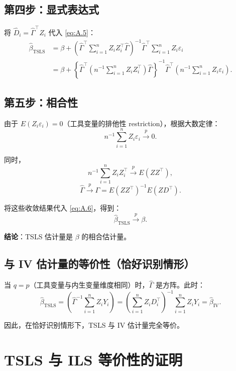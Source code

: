 \subsection*{第四步：显式表达式}

将 $\hat{D}_i = \hat{\Gamma}^{\top}Z_i$ 代入 \cref{eq:A.5}：
\[
\begin{aligned}
\hat{\beta}_{\mathrm{TSLS}} &= \beta + \left(\hat{\Gamma}^{\top}\sum_{i=1}^{n}Z_iZ_i^{\top}\hat{\Gamma}\right)^{-1}\hat{\Gamma}^{\top}\sum_{i=1}^{n}Z_i\varepsilon_i \\
&= \beta + \left\{\hat{\Gamma}^{\top}\left(n^{-1}\sum_{i=1}^{n}Z_iZ_i^{\top}\right)\hat{\Gamma}\right\}^{-1}\hat{\Gamma}^{\top}\left(n^{-1}\sum_{i=1}^{n}Z_i\varepsilon_i\right). \label{eq:A.6}
\end{aligned}
\]

\subsection*{第五步：相合性}

由于 $E(Z_i\varepsilon_i) = 0$（工具变量的排他性 restriction），根据大数定律：
\[
n^{-1}\sum_{i=1}^{n}Z_i\varepsilon_i \xrightarrow{p} 0.
\]

同时，
\[
n^{-1}\sum_{i=1}^{n}Z_iZ_i^{\top} \xrightarrow{p} E(ZZ^{\top}),
\]
\[
\hat{\Gamma} \xrightarrow{p} \Gamma = E(ZZ^{\top})^{-1}E(ZD^{\top}).
\]

将这些收敛结果代入 \cref{eq:A.6}，得到：
\[
\hat{\beta}_{\mathrm{TSLS}} \xrightarrow{p} \beta. \label{eq:A.7}
\]

\textbf{结论}：TSLS 估计量是 $\beta$ 的相合估计量。

\subsection*{与 IV 估计量的等价性（恰好识别情形）}

当 $q = p$（工具变量与内生变量维度相同）时，$\hat{\Gamma}$ 是方阵。此时：
\[
\hat{\beta}_{\mathrm{TSLS}} = \left(\hat{\Gamma}^{-1}\sum_{i=1}^{n}Z_iY_i\right) = \left(\sum_{i=1}^{n}Z_iD_i^{\top}\right)^{-1}\sum_{i=1}^{n}Z_iY_i = \hat{\beta}_{\mathrm{IV}}.
\]

因此，在恰好识别情形下，TSLS 与 IV 估计量完全等价。

\section{TSLS 与 ILS 等价性的证明}\label{sec:appendix-TSLS-ILS-proof}

